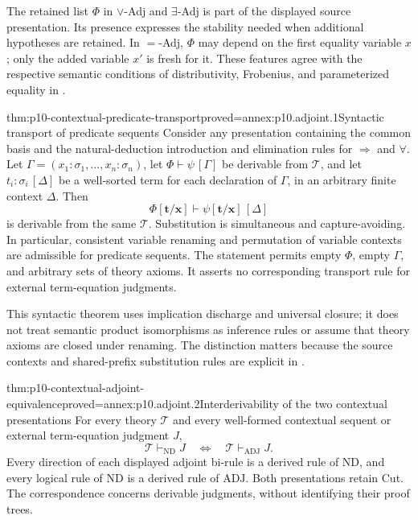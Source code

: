 
The retained list \(\Phi\) in \(\vee\)-Adj and
\(\exists\)-Adj is part of the displayed source presentation.
Its presence expresses the stability needed when additional
hypotheses are retained. In \(=\)-Adj, \(\Phi\) may depend on
the first equality variable \(x\); only the added variable \(x'\)
is fresh for it. These features agree with the respective semantic
conditions of distributivity, Frobenius, and parameterized equality
in \cite[pp.~48--49, 52--53, 55--56]{Pitts1995Draft}.

\begin{hbtheorem}{thm:p10-contextual-predicate-transport}{proved=annex:p10.adjoint.1}{Syntactic transport of predicate sequents}
Consider any presentation containing the common basis and the
natural-deduction introduction and elimination rules for
\(\Rightarrow\) and \(\forall\).
Let \(\Gamma=(x_1:\sigma_1,\ldots,x_n:\sigma_n)\), let
\(\Phi\vdash\psi\,[\Gamma]\) be derivable from \(\mathcal T\),
and let \(t_i:\sigma_i\,[\Delta]\) be a well-sorted term for
each declaration of \(\Gamma\), in an arbitrary finite context
\(\Delta\). Then
\[
       \Phi[\mathbf t/\mathbf x]\vdash
       \psi[\mathbf t/\mathbf x]\,[\Delta]
\]
is derivable from the same \(\mathcal T\).
Substitution is simultaneous and capture-avoiding.
In particular, consistent variable renaming and permutation of
variable contexts are admissible for predicate sequents.
The statement permits empty \(\Phi\), empty \(\Gamma\), and
arbitrary sets of theory axioms. It asserts no corresponding
transport rule for external term-equation judgments.
\end{hbtheorem}

This syntactic theorem uses implication discharge and universal
closure; it does not treat semantic product isomorphisms as
inference rules or assume that theory axioms are closed under
renaming. The distinction matters because the source contexts and
shared-prefix substitution rules are explicit in
\cite[Definition~2.1.1, p.~6; Figure~1, p.~7;
Remark~3.0.2, p.~14; \S5.1, pp.~40--41]{Pitts1995Draft}.

\begin{hbtheorem}{thm:p10-contextual-adjoint-equivalence}{proved=annex:p10.adjoint.2}{Interderivability of the two contextual presentations}
For every theory \(\mathcal T\) and every well-formed contextual
sequent or external term-equation judgment \(J\),
\[
       \mathcal T\vdash_{\mathrm{ND}}J
       \quad\Longleftrightarrow\quad
       \mathcal T\vdash_{\mathrm{ADJ}}J.
\]
Every direction of each displayed adjoint bi-rule is a derived rule
of \(\mathrm{ND}\), and every logical rule of \(\mathrm{ND}\)
is a derived rule of \(\mathrm{ADJ}\).
Both presentations retain Cut. The correspondence concerns
derivable judgments, without identifying their proof trees.
\end{hbtheorem}

